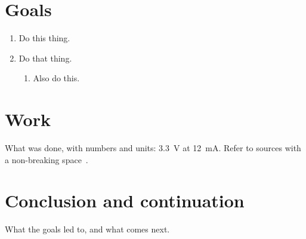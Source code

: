 \documentclass[a4paper, 11pt]{article}
\begin{document}
\makenotetitle

\section{Goals}
\begin{enumerate}
  \item Do this thing.
  \item Do that thing.
    \begin{enumerate}
      \item Also do this.
    \end{enumerate}
\end{enumerate}

\section{Work}
What was done, with numbers and units: \SI{3.3}{\volt} at \SI{12}{\milli\ampere}.
Refer to sources with a non-breaking space~\cite{knuth1986}.

\section{Conclusion and continuation}
What the goals led to, and what comes next.

\printbibliography
\end{document}
